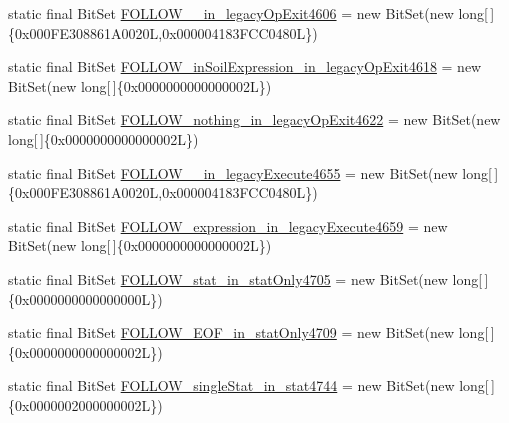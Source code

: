 \begin{DoxyCompactItemize}
\item 
static final Bit\-Set \hyperlink{classorg_1_1tzi_1_1use_1_1parser_1_1testsuite_1_1_test_suite_parser_a0b544beb4e8965bb97a022948ad71f3b}{F\-O\-L\-L\-O\-W\-\_\-\_\-in\-\_\-legacy\-Op\-Exit4606} = new Bit\-Set(new long\mbox{[}$\,$\mbox{]}\{0x000\-F\-E308861\-A0020\-L,0x000004183\-F\-C\-C0480\-L\})
\item 
static final Bit\-Set \hyperlink{classorg_1_1tzi_1_1use_1_1parser_1_1testsuite_1_1_test_suite_parser_aca6d51f0530306491b76cca32f80b81c}{F\-O\-L\-L\-O\-W\-\_\-in\-Soil\-Expression\-\_\-in\-\_\-legacy\-Op\-Exit4618} = new Bit\-Set(new long\mbox{[}$\,$\mbox{]}\{0x0000000000000002\-L\})
\item 
static final Bit\-Set \hyperlink{classorg_1_1tzi_1_1use_1_1parser_1_1testsuite_1_1_test_suite_parser_a9b932efc3f15adff5414ce21585f3208}{F\-O\-L\-L\-O\-W\-\_\-nothing\-\_\-in\-\_\-legacy\-Op\-Exit4622} = new Bit\-Set(new long\mbox{[}$\,$\mbox{]}\{0x0000000000000002\-L\})
\item 
static final Bit\-Set \hyperlink{classorg_1_1tzi_1_1use_1_1parser_1_1testsuite_1_1_test_suite_parser_a92355d3096a9e3f7b64d1bab55cbf240}{F\-O\-L\-L\-O\-W\-\_\-\_\-in\-\_\-legacy\-Execute4655} = new Bit\-Set(new long\mbox{[}$\,$\mbox{]}\{0x000\-F\-E308861\-A0020\-L,0x000004183\-F\-C\-C0480\-L\})
\item 
static final Bit\-Set \hyperlink{classorg_1_1tzi_1_1use_1_1parser_1_1testsuite_1_1_test_suite_parser_a32bbc3be405d9c9411bd65e67c78dc42}{F\-O\-L\-L\-O\-W\-\_\-expression\-\_\-in\-\_\-legacy\-Execute4659} = new Bit\-Set(new long\mbox{[}$\,$\mbox{]}\{0x0000000000000002\-L\})
\item 
static final Bit\-Set \hyperlink{classorg_1_1tzi_1_1use_1_1parser_1_1testsuite_1_1_test_suite_parser_ab2b1c7d55084e410ca7f1517a00f6e2b}{F\-O\-L\-L\-O\-W\-\_\-stat\-\_\-in\-\_\-stat\-Only4705} = new Bit\-Set(new long\mbox{[}$\,$\mbox{]}\{0x0000000000000000\-L\})
\item 
static final Bit\-Set \hyperlink{classorg_1_1tzi_1_1use_1_1parser_1_1testsuite_1_1_test_suite_parser_aa2cb5cfb9017b251b0b81e459035bb8a}{F\-O\-L\-L\-O\-W\-\_\-\-E\-O\-F\-\_\-in\-\_\-stat\-Only4709} = new Bit\-Set(new long\mbox{[}$\,$\mbox{]}\{0x0000000000000002\-L\})
\item 
static final Bit\-Set \hyperlink{classorg_1_1tzi_1_1use_1_1parser_1_1testsuite_1_1_test_suite_parser_ad694023c4c52c0f078abf50e414831cf}{F\-O\-L\-L\-O\-W\-\_\-single\-Stat\-\_\-in\-\_\-stat4744} = new Bit\-Set(new long\mbox{[}$\,$\mbox{]}\{0x0000002000000002\-L\})
\item 

\end{DoxyCompactItemize}
